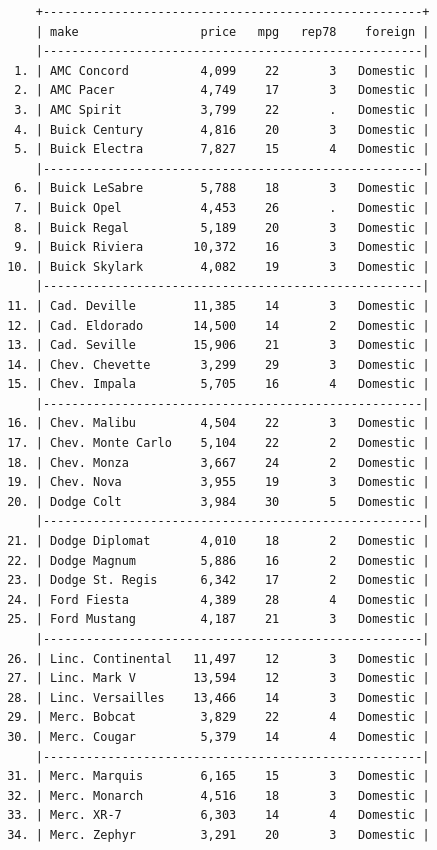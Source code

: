 \documentclass[
]{book}
\begin{document}
\begin{verbatim}
     +-----------------------------------------------------+
     | make                 price   mpg   rep78    foreign |
     |-----------------------------------------------------|
  1. | AMC Concord          4,099    22       3   Domestic |
  2. | AMC Pacer            4,749    17       3   Domestic |
  3. | AMC Spirit           3,799    22       .   Domestic |
  4. | Buick Century        4,816    20       3   Domestic |
  5. | Buick Electra        7,827    15       4   Domestic |
     |-----------------------------------------------------|
  6. | Buick LeSabre        5,788    18       3   Domestic |
  7. | Buick Opel           4,453    26       .   Domestic |
  8. | Buick Regal          5,189    20       3   Domestic |
  9. | Buick Riviera       10,372    16       3   Domestic |
 10. | Buick Skylark        4,082    19       3   Domestic |
     |-----------------------------------------------------|
 11. | Cad. Deville        11,385    14       3   Domestic |
 12. | Cad. Eldorado       14,500    14       2   Domestic |
 13. | Cad. Seville        15,906    21       3   Domestic |
 14. | Chev. Chevette       3,299    29       3   Domestic |
 15. | Chev. Impala         5,705    16       4   Domestic |
     |-----------------------------------------------------|
 16. | Chev. Malibu         4,504    22       3   Domestic |
 17. | Chev. Monte Carlo    5,104    22       2   Domestic |
 18. | Chev. Monza          3,667    24       2   Domestic |
 19. | Chev. Nova           3,955    19       3   Domestic |
 20. | Dodge Colt           3,984    30       5   Domestic |
     |-----------------------------------------------------|
 21. | Dodge Diplomat       4,010    18       2   Domestic |
 22. | Dodge Magnum         5,886    16       2   Domestic |
 23. | Dodge St. Regis      6,342    17       2   Domestic |
 24. | Ford Fiesta          4,389    28       4   Domestic |
 25. | Ford Mustang         4,187    21       3   Domestic |
     |-----------------------------------------------------|
 26. | Linc. Continental   11,497    12       3   Domestic |
 27. | Linc. Mark V        13,594    12       3   Domestic |
 28. | Linc. Versailles    13,466    14       3   Domestic |
 29. | Merc. Bobcat         3,829    22       4   Domestic |
 30. | Merc. Cougar         5,379    14       4   Domestic |
     |-----------------------------------------------------|
 31. | Merc. Marquis        6,165    15       3   Domestic |
 32. | Merc. Monarch        4,516    18       3   Domestic |
 33. | Merc. XR-7           6,303    14       4   Domestic |
 34. | Merc. Zephyr         3,291    20       3   Domestic |

\end{verbatim}
\end{document}
